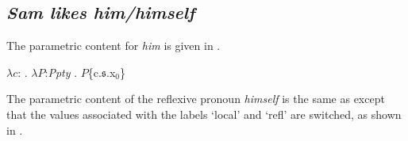\subsection{\textit{Sam likes him/himself}}

The parametric content for \textit{him} is given in \nexteg{}.

\begin{ex} 
$\lambda
c$: . 
$\lambda P$:\textit{Ppty} . $P$\{c.$\mathfrak{s}$.x$_0$\}
\end{ex} 

The parametric content of the reflexive pronoun \textit{himself} is
the same as \preveg{} except that the values associated with the
labels `local' and `refl' are switched, as shown in \nexteg{}.

